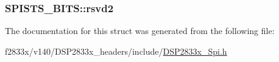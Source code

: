 \subsubsection[{rsvd2}]{ S\+P\+I\+S\+T\+S\+\_\+\+B\+I\+T\+S\+::rsvd2}\label{struct_s_p_i_s_t_s___b_i_t_s_aa90b2c8ec2b89ae143952e6d8fe9e232}


The documentation for this struct was generated from the following file\+:\begin{DoxyCompactItemize}
\item 
f2833x/v140/\+D\+S\+P2833x\+\_\+headers/include/\hyperlink{_d_s_p2833x___spi_8h}{D\+S\+P2833x\+\_\+\+Spi.\+h}\end{DoxyCompactItemize}
